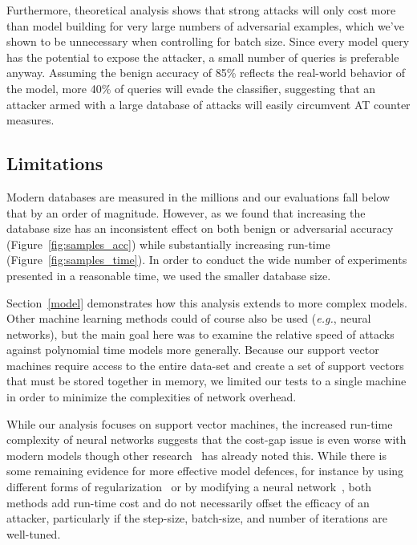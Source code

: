 \documentclass[fonts]{icst}
\begin{document}
Furthermore, theoretical analysis shows that strong attacks will only cost more than model building for very large numbers of adversarial examples, which we've shown to be unnecessary when controlling for batch size.
Since every model query has the potential to expose the attacker, a small number of queries is preferable anyway.
Assuming the benign accuracy of 85\% reflects the real-world behavior of the model, more 40\% of queries will evade the classifier, suggesting that an attacker armed with a large database of attacks will easily circumvent AT counter measures.

\subsection{Limitations}

Modern databases are measured in the millions and our evaluations fall below that by an order of magnitude.
However, as we found that increasing the database size has an inconsistent effect on both benign or adversarial accuracy (Figure~\ref{fig:samples_acc}) while substantially increasing run-time (Figure~\ref{fig:samples_time}).
In order to conduct the wide number of experiments presented in a reasonable time, we used the smaller database size.

Section~\ref{model} demonstrates how this analysis extends to more complex models.
Other machine learning methods could of course also be used (\textit{e.g.}, neural networks), but the main goal here was to examine the relative speed of attacks against polynomial time models more generally.
Because our support vector machines require access to the entire data-set and create a set of support vectors that must be stored together in memory, we limited our tests to a single machine in order to minimize the complexities of network overhead.

While our analysis focuses on support vector machines, the increased run-time complexity of neural networks suggests that the cost-gap issue is even worse with modern models though other research~\cite{meyers2023safety,croce2020reliable} has already noted this.
While there is some remaining evidence for more effective model defences, for instance by using different forms of regularization~\cite{jakubovitz2018improving,ross2018improving} or by modifying a neural network~\cite{firenet}, both methods add run-time cost and do not necessarily offset the efficacy of an attacker, particularly if the step-size, batch-size, and number of iterations are well-tuned.
\end{document}
